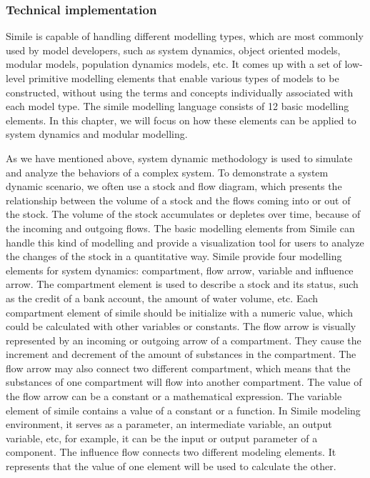 \subsubsection{Technical implementation}
\par
Simile is capable of handling different modelling types, which are most commonly used by model developers, such as system dynamics, object oriented models, modular models, population dynamics models, etc. \autocite{dsl:simile-simulistics} It comes up with a set of low-level primitive modelling elements that enable various types of models to be constructed, without using the terms and concepts individually associated with each model type. \autocite{dsl:simile-muetzelfeldt} The simile modelling language consists of 12 basic modelling elements. In this chapter, we will focus on how these elements can be applied to system dynamics and modular modelling.
\par
As we have mentioned above, system dynamic methodology is used to simulate and analyze the behaviors of a complex system. To demonstrate a system dynamic scenario, we often use a stock and flow diagram, which presents the relationship between the volume of a stock and the flows coming into or out of the stock. The volume of the stock accumulates or depletes over time, because of the incoming and outgoing flows. The basic modelling elements from Simile can handle this kind of modelling and provide a visualization tool for users to analyze the changes of the stock in a quantitative way. Simile provide four modelling elements for system dynamics: compartment, flow arrow, variable and influence arrow. The compartment element is used to describe a stock and its status, such as the credit of a bank account, the amount of water volume, etc. Each compartment element of simile should be initialize with a numeric value, which could be calculated with other variables or constants. The flow arrow is visually represented by an incoming or outgoing arrow of a compartment. They cause the increment and decrement of the amount of substances in the compartment. The flow arrow may also connect two different compartment, which means that the substances of one compartment will flow into another compartment. The value of the flow arrow can be a constant or a mathematical expression. The variable element of simile contains a value of a constant or a function. In Simile modeling environment, it serves as a parameter, an intermediate variable, an output variable, etc, for example, it can be the input or output parameter of a component. The influence flow connects two different modeling elements. It represents that the value of one element will be used to calculate the other.
